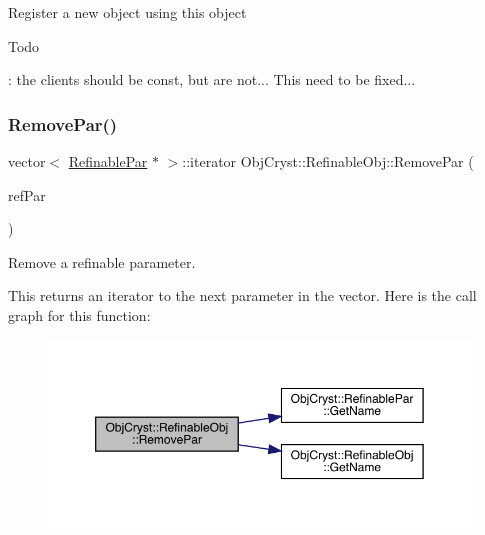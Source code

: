 Register a new object using this object \begin{DoxyRefDesc}{Todo}
\item[\mbox{\hyperlink{todo__todo000004}{Todo}}]\+: the clients should be const, but are not... This need to be fixed... \end{DoxyRefDesc}
\mbox{\label{class_obj_cryst_1_1_refinable_obj_a2a46afb65cf67e18ee8d0e0aeddbf1a4}} 
\subsubsection{\texorpdfstring{RemovePar()}{RemovePar()}}
{\footnotesize\ttfamily vector$<$ \mbox{\hyperlink{class_obj_cryst_1_1_refinable_par}{Refinable\+Par}} $\ast$ $>$\+::iterator Obj\+Cryst\+::\+Refinable\+Obj\+::\+Remove\+Par (\begin{DoxyParamCaption}\item[{\mbox{\hyperlink{class_obj_cryst_1_1_refinable_par}{Refinable\+Par}} $\ast$}]{ref\+Par }\end{DoxyParamCaption})}

Remove a refinable parameter.

This returns an iterator to the next parameter in the vector. Here is the call graph for this function\+:
\nopagebreak
\begin{figure}[H]
\begin{center}
\leavevmode
\includegraphics[width=350pt]{class_obj_cryst_1_1_refinable_obj_a2a46afb65cf67e18ee8d0e0aeddbf1a4_cgraph}
\end{center}
\end{figure}
\mbox{\label{class_obj_cryst_1_1_refinable_obj_a2645dadc4118c81e26fdc9d5145b5e1f}} 
